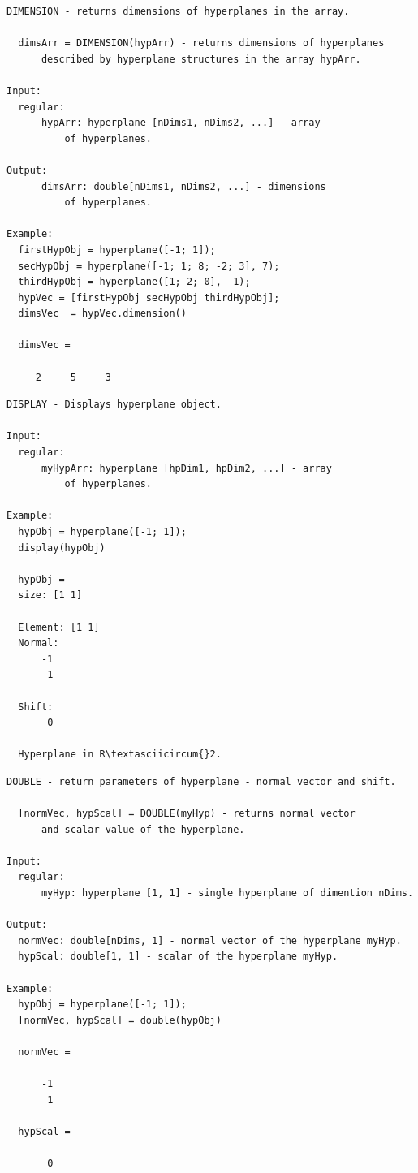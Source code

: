 \documentclass[letterpaper,10pt,english]{sphinxmanual}
\begin{document}
\begin{Verbatim}[commandchars=\\\{\}]
DIMENSION - returns dimensions of hyperplanes in the array.

  dimsArr = DIMENSION(hypArr) - returns dimensions of hyperplanes
      described by hyperplane structures in the array hypArr.

Input:
  regular:
      hypArr: hyperplane [nDims1, nDims2, ...] - array
          of hyperplanes.

Output:
      dimsArr: double[nDims1, nDims2, ...] - dimensions
          of hyperplanes.

Example:
  firstHypObj = hyperplane([-1; 1]);
  secHypObj = hyperplane([-1; 1; 8; -2; 3], 7);
  thirdHypObj = hyperplane([1; 2; 0], -1);
  hypVec = [firstHypObj secHypObj thirdHypObj];
  dimsVec  = hypVec.dimension()

  dimsVec =

     2     5     3
\end{Verbatim}

\begin{Verbatim}[commandchars=\\\{\}]
DISPLAY - Displays hyperplane object.

Input:
  regular:
      myHypArr: hyperplane [hpDim1, hpDim2, ...] - array
          of hyperplanes.

Example:
  hypObj = hyperplane([-1; 1]);
  display(hypObj)

  hypObj =
  size: [1 1]

  Element: [1 1]
  Normal:
      -1
       1

  Shift:
       0

  Hyperplane in R\textasciicircum{}2.
\end{Verbatim}

\begin{Verbatim}[commandchars=\\\{\}]
DOUBLE - return parameters of hyperplane - normal vector and shift.

  [normVec, hypScal] = DOUBLE(myHyp) - returns normal vector
      and scalar value of the hyperplane.

Input:
  regular:
      myHyp: hyperplane [1, 1] - single hyperplane of dimention nDims.

Output:
  normVec: double[nDims, 1] - normal vector of the hyperplane myHyp.
  hypScal: double[1, 1] - scalar of the hyperplane myHyp.

Example:
  hypObj = hyperplane([-1; 1]);
  [normVec, hypScal] = double(hypObj)

  normVec =

      -1
       1

  hypScal =

       0
\end{Verbatim}
\end{document}
